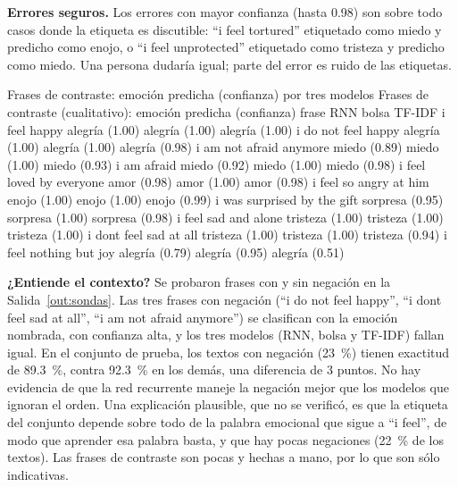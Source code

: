 \documentclass[11pt,letterpaper]{article}
\begin{document}
\textbf{Errores seguros.} Los errores con mayor confianza (hasta 0.98) son sobre todo casos donde la etiqueta es discutible: ``i feel tortured'' etiquetado como miedo y predicho como enojo, o ``i feel unprotected'' etiquetado como tristeza y predicho como miedo. Una persona dudaría igual; parte del error es ruido de las etiquetas.

\begin{consola}[label=out:sondas]{Frases de contraste: emoción predicha (confianza) por tres modelos}
Frases de contraste (cualitativo): emoción predicha (confianza)
                      frase             RNN           bolsa          TF-IDF
               i feel happy  alegría (1.00)  alegría (1.00)  alegría (1.00)
        i do not feel happy  alegría (1.00)  alegría (1.00)  alegría (0.98)
    i am not afraid anymore    miedo (0.89)    miedo (1.00)    miedo (0.93)
                i am afraid    miedo (0.92)    miedo (1.00)    miedo (0.98)
   i feel loved by everyone     amor (0.98)     amor (1.00)     amor (0.98)
     i feel so angry at him    enojo (1.00)    enojo (1.00)    enojo (0.99)
i was surprised by the gift sorpresa (0.95) sorpresa (1.00) sorpresa (0.98)
       i feel sad and alone tristeza (1.00) tristeza (1.00) tristeza (1.00)
     i dont feel sad at all tristeza (1.00) tristeza (1.00) tristeza (0.94)
     i feel nothing but joy  alegría (0.79)  alegría (0.95)  alegría (0.51)
\end{consola}

\textbf{¿Entiende el contexto?} Se probaron frases con y sin negación en la Salida~\ref{out:sondas}. Las tres frases con negación (``i do not feel happy'', ``i dont feel sad at all'', ``i am not afraid anymore'') se clasifican con la emoción nombrada, con confianza alta, y los tres modelos (RNN, bolsa y TF-IDF) fallan igual. En el conjunto de prueba, los textos con negación (23~\%) tienen exactitud de 89.3~\%, contra 92.3~\% en los demás, una diferencia de 3 puntos. No hay evidencia de que la red recurrente maneje la negación mejor que los modelos que ignoran el orden. Una explicación plausible, que no se verificó, es que la etiqueta del conjunto depende sobre todo de la palabra emocional que sigue a ``i feel'', de modo que aprender esa palabra basta, y que hay pocas negaciones (22~\% de los textos). Las frases de contraste son pocas y hechas a mano, por lo que son sólo indicativas.
\end{document}
